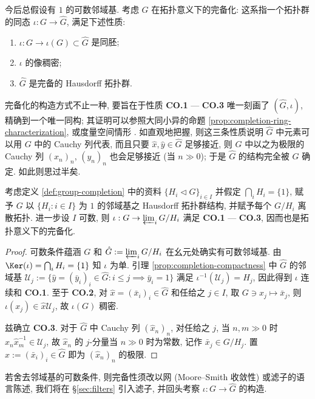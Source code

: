今后总假设有 $1$ 的可数邻域基. 考虑 $G$ 在拓扑意义下的完备化: 这系指一个拓扑群的同态 $\iota: G \to \hat{G}$, 满足下述性质:
\begin{enumerate}[\bfseries {CO}.1]
	\item $\iota: G \to \iota(G) \subset \hat{G}$ 是同胚;
	\item $\iota$ 的像稠密;
	\item $\hat{G}$ 是完备的 Hausdorff 拓扑群.
\end{enumerate}
完备化的构造方式不止一种, 要旨在于性质 \textbf{CO.1} --- \textbf{CO.3} 唯一刻画了 $(\hat{G}, \iota)$, 精确到一个唯一同构; 其证明可以参照大同小异的命题 \ref{prop:completion-ring-characterization}, 或度量空间情形 \cite[\S 8.1]{Xiong}. 如直观地把握, 则这三条性质说明 $\hat{G}$ 中元素可以用 $G$ 中的 Cauchy 列代表, 而且只要 $\hat{x}, \hat{y} \in \hat{G}$ 足够接近, 则 $G$ 中以之为极限的 Cauchy 列 $(x_n)_n$, $(y_n)_n$ 也会足够接近 (当 $n \gg 0$); 于是 $\hat{G}$ 的结构完全被 $G$ 确定. 如此则思过半矣.

\begin{theorem}
	考虑定义 \ref{def:group-completion} 中的资料 $\{ H_i \lhd G \}_{i \in I}$ 并假定 $\bigcap_i H_i = \{1\}$, 赋予 $G$ 以 $\{H_i : i \in I \}$ 为 $1$ 的邻域基之 Hausdorff 拓扑群结构, 并赋予每个 $G/H_i$ 离散拓扑. 进一步设 $I$ 可数, 则 $\iota: G \to \varprojlim_i G/H_i$ 满足 \textbf{CO.1} --- \textbf{CO.3}, 因而也是拓扑意义下的完备化.
\end{theorem}
\begin{proof}
	可数条件蕴涵 $G$ 和 $\hat{G} := \varprojlim_i G/H_i$ 在幺元处确实有可数邻域基. 由 $\Ker(\iota) = \bigcap_i H_i = \{1\}$ 知 $\iota$ 为单. 引理 \ref{prop:completion-compactness} 中 $\hat{G}$ 的邻域基 $\mathcal{U}_j := \{ \hat{y}=(\bar{y}_i)_i \in \hat{G}: i \leq j \implies \bar{y}_i = 1 \}$ 满足 $\iota^{-1}(\mathcal{U}_j) = H_j$, 因此得到 $\iota$ 连续和 \textbf{CO.1}. 至于 \textbf{CO.2}, 对 $\hat{x} = (\bar{x}_i)_i \in \hat{G}$ 和任给之 $j \in I$, 取 $G \ni x_j \mapsto \bar{x}_j$, 则 $\iota(x_j) \in \hat{x}\mathcal{U}_j$, 故 $\iota(G)$ 稠密.
	
	兹确立 \textbf{CO.3}. 对于 $\hat{G}$ 中 Cauchy 列 $(\hat{x}_n)_n$, 对任给之 $j$, 当 $n,m \gg 0$ 时 $\hat{x}_n \hat{x}_m^{-1} \in \mathcal{U}_j$, 故 $\hat{x}_n$ 的 $j$-分量当 $n \gg 0$ 时为常数, 记作 $\bar{x}_j \in G/H_j$. 置 $\hat{x} := (\bar{x}_i)_i \in \hat{G}$ 即为 $(\hat{x}_n)_n$ 的极限.
\end{proof}

\begin{remark}
	若舍去邻域基的可数条件, 则完备性须改以网 (Moore--Smith 收敛性) 或滤子的语言陈述, 我们将在 \S\ref{sec:filters} 引入滤子, 并回头考察 $\iota: G \to \hat{G}$ 的构造.
\end{remark}


